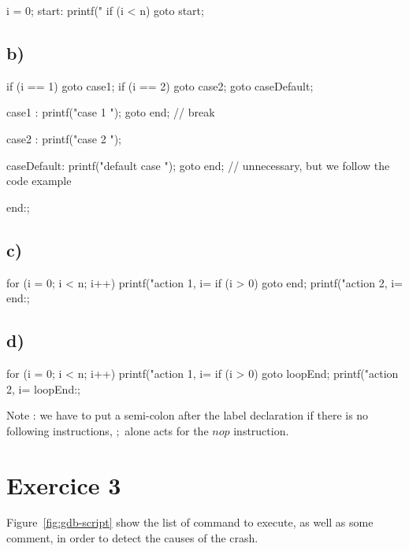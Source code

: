 \documentclass[a4paper,11pt]{report}
\begin{document}
\begin{ccode}
i = 0;
start:
printf("%
if (i < n) goto start;
\end{ccode}

\subsection*{b)}

\begin{ccode}
if (i == 1) goto case1;
if (i == 2) goto case2;
goto caseDefault;

case1 :
printf("case 1 \n");
goto end; // break

case2 :
printf("case 2 \n");

caseDefault:
printf("default case \n");
goto end; // unnecessary, but we follow the code example

end:;
\end{ccode}

\subsection*{c)}

\begin{ccode}
for (i = 0; i < n; i++)
{
    printf("action 1, i=%
    if (i > 0) goto end;
    printf("action 2, i=%
}
end:;
\end{ccode}

\subsection*{d)}

\begin{ccode}
for (i = 0; i < n; i++)
{
    printf("action 1, i=%
    if (i > 0) goto loopEnd;
    printf("action 2, i=%
    loopEnd:;
}
\end{ccode}

Note : we have to put a semi-colon after the label declaration if there is no
following instructions, $;$ alone acts for the $nop$ instruction.

\newpage

\section*{Exercice 3}

Figure~\ref{fig:gdb-script} show the list of command to execute, as well as some
comment, in order to detect the causes of the crash.
\end{document}
